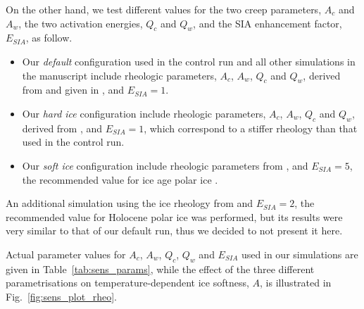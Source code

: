 On the other hand, we test different values for the two creep parameters, $A_c$
and $A_w$, the two activation energies, $Q_c$ and $Q_w$, and the SIA
enhancement factor, $E_{SIA}$, as follow.

\begin{itemize}
    \item{Our \emph{default} configuration used in the control run and all other
          simulations in the manuscript include rheologic parameters, $A_c$,
          $A_w$, $Q_c$ and $Q_w$, derived from \citet{Paterson.Budd.1982} and
          given in \citet[Eqn.~5]{Bueler.Brown.2009}, and $E_{SIA}=1$.}
    \item{Our \emph{hard ice} configuration include rheologic parameters,
          $A_c$, $A_w$, $Q_c$ and $Q_w$, derived from
          \citet[p.~72 and 76]{Cuffey.Paterson.2010}, and $E_{SIA}=1$, which
          correspond to a stiffer rheology than that used in the control run.}
    \item{Our \emph{soft ice} configuration include rheologic parameters
          from \citet{Cuffey.Paterson.2010}, and $E_{SIA}=5$, the
          recommended value for ice age polar ice
          \citep[p.~77]{Cuffey.Paterson.2010}.}
\end{itemize}

An additional simulation using the ice rheology from
\citet{Cuffey.Paterson.2010} and $E_{SIA}=2$, the
recommended value for Holocene polar ice \citep[p.~77]{Cuffey.Paterson.2010}
was performed, but its results were very similar to that of our default run,
thus we decided to not present it here.

Actual parameter values for $A_c$, $A_w$, $Q_c$, $Q_w$ and $E_{SIA}$ used in
our simulations are given in Table~\ref{tab:sens_params}, while the effect of
the three different parametrisations on temperature-dependent ice softness,
$A$, is illustrated in Fig.~\ref{fig:sens_plot_rheo}.

